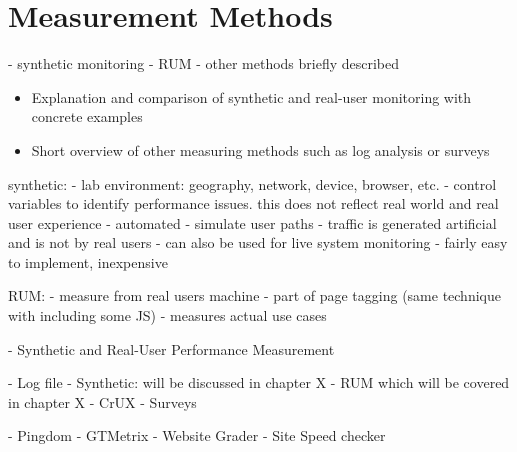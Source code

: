 



\section{Measurement Methods}


- synthetic monitoring
- RUM
- other methods briefly described


\begin{itemize}
\item Explanation and comparison of synthetic and real-user monitoring with concrete examples
\item Short overview of other measuring methods such as log analysis or surveys
\end{itemize}








synthetic:
- lab environment: geography, network, device, browser, etc.
- control variables to identify performance issues. this does not reflect real world and real user experience
- automated
- simulate user paths
- traffic is generated artificial and is not by real users
 - can also be used for live system monitoring
 - fairly easy to implement, inexpensive

RUM:
- measure from real users machine
- part of page tagging (same technique with including some JS)
- measures actual use cases



- Synthetic and Real-User Performance Measurement



- Log file
- Synthetic: will be discussed in chapter X
- RUM which will be covered in chapter X
- CrUX
- Surveys


- Pingdom
- GTMetrix
- Website Grader
- Site Speed checker





